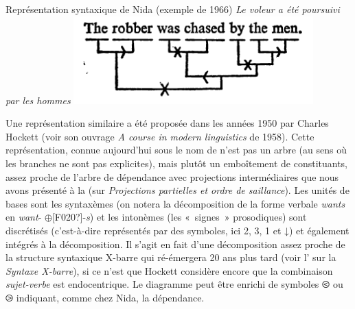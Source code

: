 {    Représentation syntaxique de Nida (exemple de 1966) \textit{Le voleur a été poursuivi par les hommes}
    \includegraphics[width=\textwidth]{figures/vol1syntaxe2-img023.png}

    Une représentation similaire a été proposée dans les années 1950 par Charles Hockett (voir son ouvrage \textit{A course in modern linguistics} de 1958). Cette représentation, connue aujourd’hui sous le nom de  n’est pas un arbre (au sens où les branches ne sont pas explicites), mais plutôt un emboîtement de constituants, assez proche de l’arbre de dépendance avec projections intermédiaires que nous avons présenté à la  (sur \textit{Projections partielles et ordre de saillance}). Les unités de bases sont les syntaxèmes (on notera la décomposition de la forme verbale \textit{wants} en \textit{want}{}- \textrm{${\oplus}$}[F020?]{}-\textit{s}) et les intonèmes (les «~signes~» prosodiques) sont discrétisés (c’est-à-dire représentés par des symboles, ici 2, 3, 1 et ↓) et également intégrés à la décomposition. Il s’agit en fait d’une décomposition assez proche de la structure syntaxique X-barre qui ré-émergera 20 ans plus tard (voir l’ sur la \textit{Syntaxe X-barre}), si ce n’est que Hockett considère encore que la combinaison \textit{sujet-verbe} est endocentrique. Le diagramme peut être enrichi de symboles \textrm{⧀} ou \textrm{⧁} indiquant, comme chez Nida, la dépendance.

}
